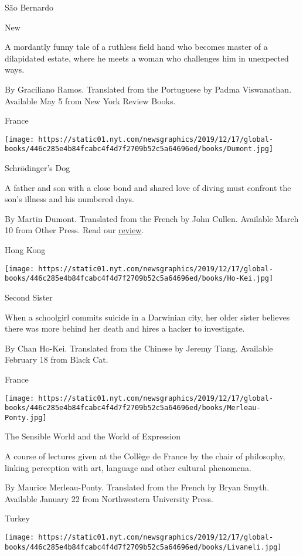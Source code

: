 São Bernardo

New

A mordantly funny tale of a ruthless field hand who becomes master of a
dilapidated estate, where he meets a woman who challenges him in
unexpected ways.

 By Graciliano Ramos. Translated from the Portuguese by Padma
Viswanathan. Available May 5 from New York Review Books.

France

\texttt{[image: https://static01.nyt.com/newsgraphics/2019/12/17/global-books/446c285e4b84fcabc4f4d7f2709b52c5a64696ed/books/Dumont.jpg]}

Schrödinger's Dog

A father and son with a close bond and shared love of diving must
confront the son's illness and his numbered days.

 By Martin Dumont. Translated from the French by John Cullen. Available
March 10 from Other Press. Read our
\href{https://www.nytimes.com/2020/04/24/books/review/schrodingers-dog-martin-dumont-girls-story-annie-ernaux-finding-dora-maar-brigitte-benkemoun.html}{review}.

Hong Kong

\texttt{[image: https://static01.nyt.com/newsgraphics/2019/12/17/global-books/446c285e4b84fcabc4f4d7f2709b52c5a64696ed/books/Ho-Kei.jpg]}

Second Sister

When a schoolgirl commits suicide in a Darwinian city, her older sister
believes there was more behind her death and hires a hacker to
investigate.

 By Chan Ho-Kei. Translated from the Chinese by Jeremy Tiang. Available
February 18 from Black Cat.

France

\texttt{[image: https://static01.nyt.com/newsgraphics/2019/12/17/global-books/446c285e4b84fcabc4f4d7f2709b52c5a64696ed/books/Merleau-Ponty.jpg]}

The Sensible World and the World of Expression

A course of lectures given at the Collège de France by the chair of
philosophy, linking perception with art, language and other cultural
phenomena.

 By Maurice Merleau-Ponty. Translated from the French by Bryan Smyth.
Available January 22 from Northwestern University Press.

Turkey

\texttt{[image: https://static01.nyt.com/newsgraphics/2019/12/17/global-books/446c285e4b84fcabc4f4d7f2709b52c5a64696ed/books/Livaneli.jpg]}


